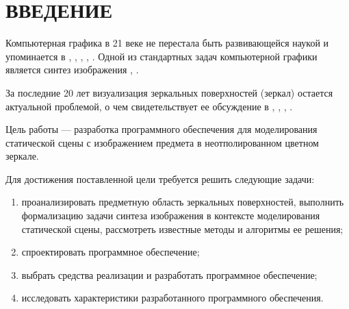 \chapter*{ВВЕДЕНИЕ}

Компьютерная графика в 21 веке не перестала быть развивающейся наукой и упоминается в \cite{залогова2005компьютерная}, \cite{порев2002компьютерная}, \cite{тозик2013инженерная}, \cite{митин2016компьютерная}, \cite{турлюн2014компьютерная}. 
Одной из стандартных задач компьютерной графики является синтез изображения \cite{порев2002компьютерная}, \cite{куров}.

За последние 20 лет визуализация зеркальных поверхностей (зеркал) остается актуальной проблемой, о чем свидетельствует ее обсуждение в \cite{lensch2005realistic}, \cite{reshetouski2013mirrors}, \cite{miguel2014real}, \cite{hiranyachattada2021demonstration}.

Цель работы --- разработка программного обеспечения для моделирования статической сцены с изображением предмета в неотполированном цветном зеркале.

Для достижения поставленной цели требуется решить следующие задачи:

\begin{enumerate}
	\item проанализировать предметную область зеркальных поверхностей, выполнить формализацию задачи синтеза изображения в контексте моделирования статической сцены, рассмотреть известные методы и алгоритмы ее решения;
	\item спроектировать программное обеспечение;
	\item выбрать средства реализации и разработать программное обеспечение;
	\item исследовать характеристики разработанного программного обеспечения.
\end{enumerate}